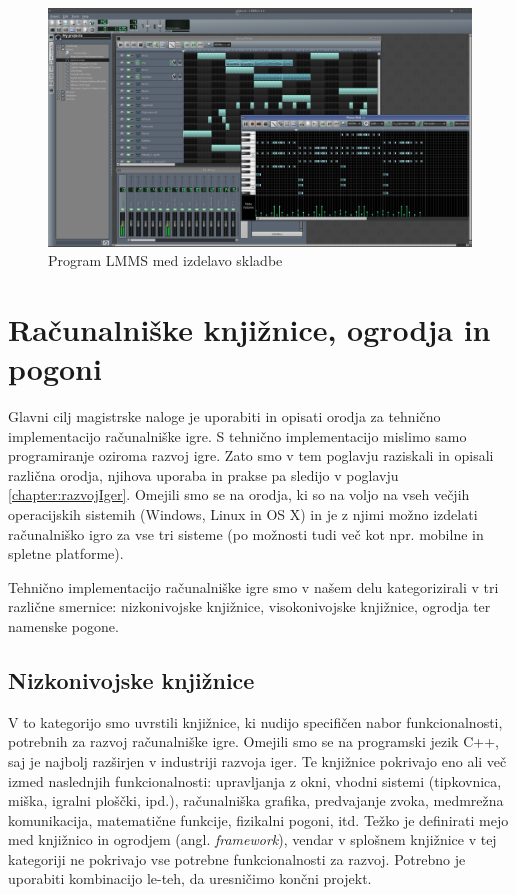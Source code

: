 \documentclass[12pt,a4paper,twoside]{book}
\begin{document}
\begin{figure}[h]
	\centering
	\includegraphics[width=12cm]{lmms}
	\caption{Program LMMS med izdelavo skladbe}
	\label{slika:lmms}
\end{figure}

\section{Računalniške knjižnice, ogrodja in pogoni}
Glavni cilj magistrske naloge je uporabiti in opisati orodja za tehnično implementacijo računalniške igre. S tehnično implementacijo mislimo samo programiranje oziroma razvoj igre. Zato smo v tem poglavju raziskali in opisali različna orodja, njihova uporaba in prakse pa sledijo v poglavju \ref{chapter:razvojIger}. Omejili smo se na orodja, ki so na voljo na vseh večjih operacijskih sistemih (Windows, Linux in OS X) in je z njimi možno izdelati računalniško igro za vse tri sisteme (po možnosti tudi več kot npr. mobilne in spletne platforme).

Tehnično implementacijo računalniške igre smo v našem delu kategorizirali v tri različne smernice: nizkonivojske knjižnice, visokonivojske knjižnice, ogrodja ter namenske pogone.

\subsection{Nizkonivojske knjižnice}
V to kategorijo smo uvrstili knjižnice, ki nudijo specifičen nabor funkcionalnosti, potrebnih za razvoj računalniške igre. Omejili smo se na programski jezik C++, saj je najbolj razširjen v industriji razvoja iger. Te knjižnice pokrivajo eno ali več izmed naslednjih funkcionalnosti: upravljanja z okni, vhodni sistemi (tipkovnica, miška, igralni ploščki, ipd.), računalniška grafika, predvajanje zvoka, medmrežna komunikacija, matematične funkcije, fizikalni pogoni, itd. Težko je definirati mejo med knjižnico in ogrodjem (angl. \textit{framework}), vendar v splošnem knjižnice v tej kategoriji ne pokrivajo vse potrebne funkcionalnosti za razvoj. Potrebno je uporabiti kombinacijo le-teh, da uresničimo končni projekt.
\end{document}

